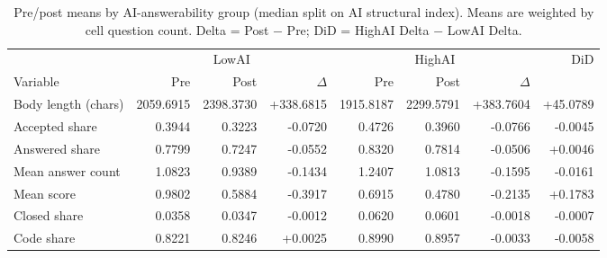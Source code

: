 \begin{table}[ht]
\centering
\caption{Pre/post means by AI-answerability group (median split on AI structural index). Means are weighted by cell question count. Delta = Post $-$ Pre; DiD = HighAI Delta $-$ LowAI Delta.}
\label{tab:prepost_resolvability_by_ai_group}
\begin{tabular}{lrrrrrrr}
\toprule
 & \multicolumn{3}{c}{LowAI} & \multicolumn{3}{c}{HighAI} & DiD \\
\cmidrule(lr){2-4} \cmidrule(lr){5-7}
Variable & Pre & Post & $\Delta$ & Pre & Post & $\Delta$ & \\
\midrule
Body length (chars) & 2059.6915 & 2398.3730 & +338.6815 & 1915.8187 & 2299.5791 & +383.7604 & +45.0789 \\
Accepted share & 0.3944 & 0.3223 & -0.0720 & 0.4726 & 0.3960 & -0.0766 & -0.0045 \\
Answered share & 0.7799 & 0.7247 & -0.0552 & 0.8320 & 0.7814 & -0.0506 & +0.0046 \\
Mean answer count & 1.0823 & 0.9389 & -0.1434 & 1.2407 & 1.0813 & -0.1595 & -0.0161 \\
Mean score & 0.9802 & 0.5884 & -0.3917 & 0.6915 & 0.4780 & -0.2135 & +0.1783 \\
Closed share & 0.0358 & 0.0347 & -0.0012 & 0.0620 & 0.0601 & -0.0018 & -0.0007 \\
Code share & 0.8221 & 0.8246 & +0.0025 & 0.8990 & 0.8957 & -0.0033 & -0.0058 \\
\bottomrule
\end{tabular}
\end{table}
